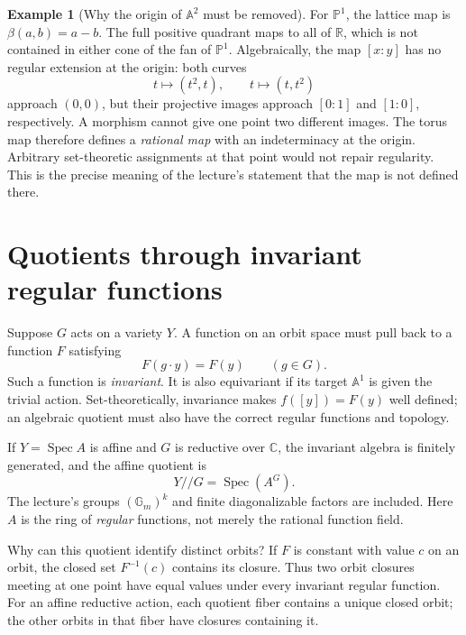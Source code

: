 \documentclass[11pt]{article}
\theoremstyle{definition}
\newtheorem{Ex}{Example}
\theoremstyle{remark}
\DeclareMathOperator{\Spec}{Spec}
\newcommand{\A}{\mathbb A}
\newcommand{\Pj}{\mathbb P}
\newcommand{\C}{\mathbb C}
\newcommand{\R}{\mathbb R}
\newcommand{\Gm}{\mathbb G_m}
\begin{document}
\begin{Ex}[Why the origin of \(\A^2\) must be removed]
For \(\Pj^1\), the lattice map is
\(\beta(a,b)=a-b\). The full positive quadrant maps to all of
\(\R\), which is not contained in either cone of the fan of
\(\Pj^1\). Algebraically, the map \([x:y]\) has no regular extension
at the origin: both curves
\[
t\longmapsto(t^2,t),\qquad
t\longmapsto(t,t^2)
\]
approach \((0,0)\), but their projective images approach \([0:1]\)
and \([1:0]\), respectively. A morphism cannot give one point two
different images.
The torus map therefore defines a \emph{rational map} with an
indeterminacy at the origin. Arbitrary set-theoretic assignments at
that point would not repair regularity. This is the precise meaning
of the lecture's statement that the map is not defined there.
\end{Ex}

\section{Quotients through invariant regular functions}

Suppose \(G\) acts on a variety \(Y\). A function on an orbit space
must pull back to a function \(F\) satisfying
\[
F(g\cdot y)=F(y)\qquad(g\in G).
\]
Such a function is \emph{invariant}. It is also equivariant if its
target \(\A^1\) is given the trivial action. Set-theoretically,
invariance makes \(f([y])=F(y)\) well defined; an algebraic quotient
must also have the correct regular functions and topology.

If \(Y=\Spec A\) is affine and \(G\) is reductive over \(\C\), the
invariant algebra is finitely generated, and the affine quotient is
\[
\boxed{Y\mathbin{//}G=\Spec(A^G).}
\]
The lecture's groups \((\Gm)^k\) and finite diagonalizable factors
are included. Here \(A\) is the ring of \emph{regular} functions,
not merely the rational function field.

Why can this quotient identify distinct orbits? If \(F\) is
constant with value \(c\) on an orbit, the closed set \(F^{-1}(c)\)
contains its closure. Thus two orbit closures meeting at one point
have equal values under every invariant regular function. For an
affine reductive action, each quotient fiber contains a unique closed
orbit; the other orbits in that fiber have closures containing it.
\end{document}
